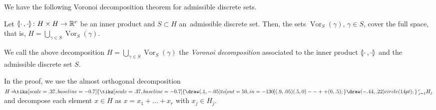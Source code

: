 \documentclass[AHL,Unicode,longabstracts]{cedram}
\newcommand{\symbuptm}{\tikz[scale=.37, baseline=-0.7]{\draw(.1,-.05)to[out=50,in=-130](.9,.05) (.5,0)--++(0,.5);}}
\newcommand{\almorth}{\tikz[scale=.37, baseline=-0.7]{\symbuptm \draw (-.44,.22) circle (14pt);}}
\newcommand{\aplus}{\hspace{-.2cm}\almorth\,}
\newcommand{\llangle}{\mathopen{\langle\mkern -3.1mu\lvert}}
\newcommand{\rrangle}{\mathclose{\rvert\mkern -3.1mu\rangle}}
\newcommand{\highinn}[2]{{\llangle#2\rrangle_{#1}}}
\DeclareMathOperator{\Vor}{Vor}
\newcommand{\R}{\mathbb{R}}
\renewcommand*{\to}{\mathchoice{\longrightarrow}{\rightarrow}{\rightarrow}{\rightarrow}}
\begin{document}
We have the following Voronoi decomposition theorem for admissible discrete sets.
\begin{theo}\label{thm:voronoi-discrete}
Let $\highinn{}{\cdot \,, \cdot} \colon H \times H \to \R^r$ be an inner product and $S \subset H$ an~admissible discrete set. Then, the sets $\Vor_S(\gamma)$, $\gamma\in S$, cover the full space, that is, $H = \bigcup_{\gamma \in S} \Vor_S(\gamma)$.
\end{theo}

We call the above decomposition $H = \bigcup_{\gamma \in S} \Vor_S(\gamma)$ the \emph{Voronoi decomposition} associated to the inner product $\highinn{}{\cdot \,, \cdot} $ and the admissible discrete set $S$.



In the proof, we use the almost orthogonal decomposition $H= \aplus_{j=1}^r H_j$ and decompose each element $x \in H$ as $x = x_1 + \dots + x_r$ with $x_j \in H_j$.
\end{document}
